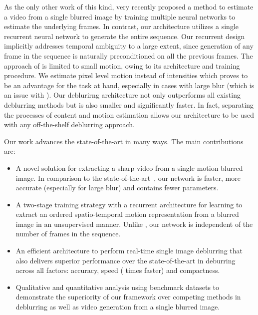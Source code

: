 \documentclass[10pt,twocolumn,letterpaper]{article}
\begin{document}
As the only other work of this kind, \cite{jin2018learning} very recently proposed a method to estimate a video from a single blurred image by training multiple neural networks to estimate the underlying frames. In contrast, our architecture utilizes a single recurrent neural network to generate the entire sequence. Our recurrent design implicitly addresses temporal ambiguity to a large extent, since generation of any frame in the sequence is naturally preconditioned on all the previous frames. The approach of \cite{jin2018learning} is limited to small motion, owing to its architecture and training procedure. We estimate pixel level motion instead of intensities which proves to be an advantage for the task at hand, especially in cases with large blur (which is an issue with \cite{jin2018learning}). Our deblurirng architecture not only outperforms all existing deblurring methods but is also smaller and significantly faster. In fact, separating the processes of content and motion estimation allows our architecture to be used with any off-the-shelf deblurring approach. 



Our work advances the state-of-the-art in many ways. The main contributions are:

\begin{itemize}
\item A novel solution for extracting a sharp video from a single motion blurred image. In comparison to the state-of-the-art~\cite{jin2018learning}, our network is faster, more accurate (especially for large blur) and contains fewer parameters.

\item A two-stage training strategy with a recurrent architecture for learning to extract an ordered spatio-temporal motion representation from a blurred image in an unsupervised manner. Unlike \cite{jin2018learning}, our network is independent of the number of frames in the sequence.

\item An efficient architecture to perform real-time single image deblurring that also delivers superior performance over the state-of-the-art in deburring~\cite{tao2018scale} across all factors: accuracy, speed ( times faster) and compactness.

\item Qualitative and quantitative analysis using benchmark datasets to demonstrate the superiority of our framework over competing methods in deblurring as well as video generation from a single blurred image. 

\end{itemize}
\end{document}
